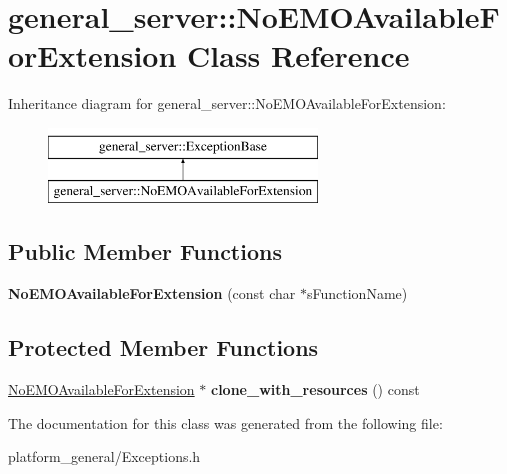 \hypertarget{classgeneral__server_1_1NoEMOAvailableForExtension}{\section{general\-\_\-server\-:\-:\-No\-E\-M\-O\-Available\-For\-Extension \-Class \-Reference}
\label{classgeneral__server_1_1NoEMOAvailableForExtension}
}
\-Inheritance diagram for general\-\_\-server\-:\-:\-No\-E\-M\-O\-Available\-For\-Extension\-:\begin{figure}[H]
\begin{center}
\leavevmode
\includegraphics[height=2.000000cm]{classgeneral__server_1_1NoEMOAvailableForExtension}
\end{center}
\end{figure}
\subsection*{\-Public \-Member \-Functions}
\begin{DoxyCompactItemize}
\item 
\hypertarget{classgeneral__server_1_1NoEMOAvailableForExtension_adfea2763ad723dd676139b00d7cf6296}{{\bfseries \-No\-E\-M\-O\-Available\-For\-Extension} (const char $\ast$s\-Function\-Name)}\label{classgeneral__server_1_1NoEMOAvailableForExtension_adfea2763ad723dd676139b00d7cf6296}

\end{DoxyCompactItemize}
\subsection*{\-Protected \-Member \-Functions}
\begin{DoxyCompactItemize}
\item 
\hypertarget{classgeneral__server_1_1NoEMOAvailableForExtension_a58c4d2106eab6d0abc363ca54bcdcb78}{\hyperlink{classgeneral__server_1_1NoEMOAvailableForExtension}{\-No\-E\-M\-O\-Available\-For\-Extension} $\ast$ {\bfseries clone\-\_\-with\-\_\-resources} () const }\label{classgeneral__server_1_1NoEMOAvailableForExtension_a58c4d2106eab6d0abc363ca54bcdcb78}

\end{DoxyCompactItemize}


\-The documentation for this class was generated from the following file\-:\begin{DoxyCompactItemize}
\item 
platform\-\_\-general/\-Exceptions.\-h\end{DoxyCompactItemize}
